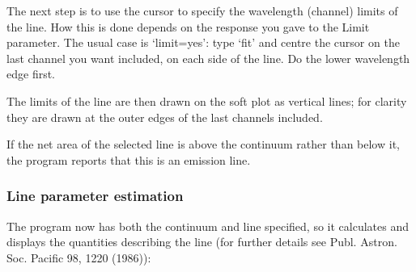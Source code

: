 \documentclass[11pt,twoside]{article}
\begin{document}
   The next step is to use the cursor to specify the wavelength
   (channel) limits of the line. How this is done depends on the
   response you gave to the Limit parameter. The usual case is
   `limit=yes': type `fit' and centre the cursor on the last channel you
   want included, on each side of the line. Do the lower wavelength edge
   first.

   The limits of the line are then drawn on the soft plot as vertical
   lines; for clarity they are drawn at the outer edges of the last
   channels included.

   If the net area of the selected line is above the continuum rather
   than below it, the program reports that this is an emission line.


\subsubsection{\label{techno11linepars}Line parameter estimation}

   The program now has both the continuum and line specified, so it
   calculates and displays the quantities describing the line (for
   further details see Publ. Astron. Soc. Pacific 98, 1220 (1986)):
\end{document}
